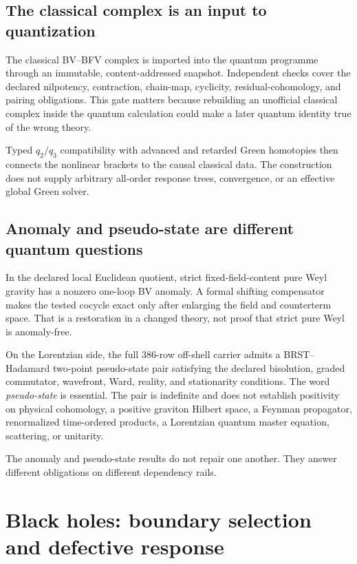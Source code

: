 \documentclass[11pt]{article}
\begin{document}
\subsection{The classical complex is an input to quantization}

The classical BV--BFV complex is imported into the quantum programme through
an immutable, content-addressed snapshot.  Independent checks cover the
declared nilpotency, contraction, chain-map, cyclicity, residual-cohomology,
and pairing obligations.  This gate matters because rebuilding an unofficial
classical complex inside the quantum calculation could make a later quantum
identity true of the wrong theory.

Typed \(q_2/q_3\) compatibility with advanced and retarded Green homotopies
then connects the nonlinear brackets to the causal classical data.  The
construction does not supply arbitrary all-order response trees, convergence,
or an effective global Green solver.

\subsection{Anomaly and pseudo-state are different quantum questions}

In the declared local Euclidean quotient, strict fixed-field-content pure
Weyl gravity has a nonzero one-loop BV anomaly.  A formal shifting compensator
makes the tested cocycle exact only after enlarging the field and counterterm
space.  That is a restoration in a changed theory, not proof that strict pure
Weyl is anomaly-free.

On the Lorentzian side, the full 386-row off-shell carrier admits a
BRST--Hadamard two-point pseudo-state pair satisfying the declared bisolution,
graded commutator, wavefront, Ward, reality, and stationarity conditions.  The
word \emph{pseudo-state} is essential.  The pair is indefinite and does not
establish positivity on physical cohomology, a positive graviton Hilbert
space, a Feynman propagator, renormalized time-ordered products, a Lorentzian
quantum master equation, scattering, or unitarity.

The anomaly and pseudo-state results do not repair one another.  They answer
different obligations on different dependency rails.

\section{Black holes: boundary selection and defective response}
\end{document}
